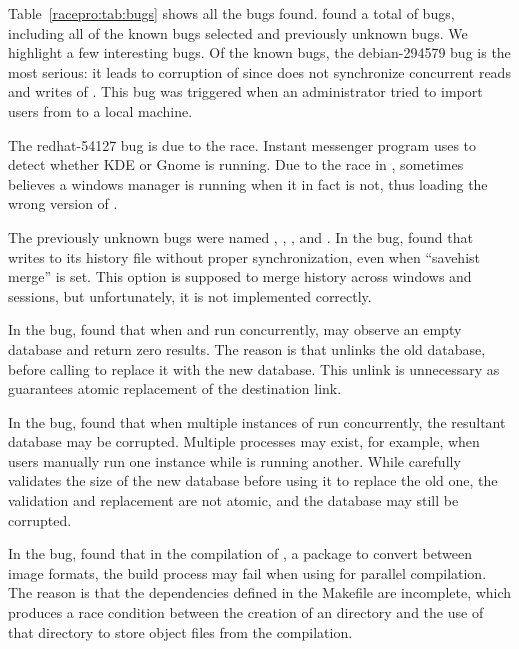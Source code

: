 Table~\ref{racepro:tab:bugs} shows all the bugs \racepro found.  \racepro found a
total of \nracepro bugs, including all of the known bugs selected and
\nracepronew previously unknown bugs.  We highlight a few interesting
bugs.  Of the known bugs, the debian-294579 bug is the most serious:
it leads to corruption of  since  does not
synchronize concurrent reads and writes of .  This bug
was triggered when an administrator tried to import users from
 to a local machine.  

The redhat-54127 bug is due to the  race.  
Instant messenger program  uses  to detect whether
KDE or Gnome is running.  Due to the race in , 
sometimes believes a windows manager is running when it in fact is
not, thus loading the wrong version of .

The \nracepronew previously unknown bugs were named ,
, , and .  In the  bug, \racepro found 
that  writes to its history file without proper
synchronization, even when ``savehist merge'' is set.  This option is
supposed to merge history across windows and sessions, but
unfortunately, it is not implemented correctly. 

In the  bug, \racepro found that when  and 
run concurrently,  may observe an empty database and return
zero results.  The reason is that  unlinks the old database,
before calling  to replace it with the new database.  This
unlink is unnecessary as  guarantees atomic replacement of the
destination link.

In the  bug, \racepro found that when multiple instances of
 run concurrently, the resultant database may be
corrupted. Multiple  processes may exist, for
example, when users manually run one instance while  is
running another.  While  carefully validates the size of
the new database before using it to replace the old one,
the validation and replacement are not atomic, and the database may
still be corrupted.

In the  bug, \racepro found that in the compilation of ,
a package to convert between image formats, the build process may fail
when using  for parallel compilation. The reason is that
the dependencies defined in the Makefile are incomplete,
which produces a race condition between the creation of an 
directory and the use of that directory to store object files from
the compilation.

